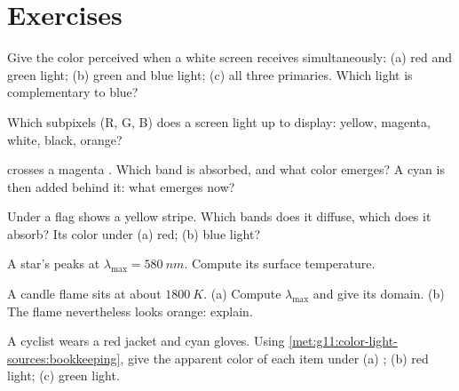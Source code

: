 \section{Exercises}

\begin{exercise}[$\star$]\label{exo:g11:color-light-sources:1}
Give the color perceived when a white screen receives simultaneously:
(a) red and green light; (b) green and blue light; (c) all three
primaries. Which light is complementary to blue?
\end{exercise}

\begin{exercise}[$\star$]\label{exo:g11:color-light-sources:2}
Which subpixels (R, G, B) does a screen light up to display: yellow,
magenta, white, black, orange?
\end{exercise}

\begin{exercise}[$\star$]\label{exo:g11:color-light-sources:3}
 crosses a magenta . Which band is absorbed, and what
color emerges? A cyan  is then added behind it: what emerges now?
\end{exercise}

\begin{exercise}[$\star$]\label{exo:g11:color-light-sources:4}
Under  a flag shows a yellow stripe. Which bands does it
diffuse, which does it absorb? Its color under (a) red; (b) blue light?
\end{exercise}

\begin{exercise}[$\star$]\label{exo:g11:color-light-sources:5}
A star's  peaks at $\lambda_{\max} = \qty{580}{nm}$.
Compute its surface temperature.
\end{exercise}

\begin{exercise}[$\star\star$]\label{exo:g11:color-light-sources:6}
A candle flame sits at about $\qty{1800}{K}$. (a) Compute
$\lambda_{\max}$ and give its domain. (b) The flame nevertheless looks
orange: explain.
\end{exercise}

\begin{exercise}[$\star\star$]\label{exo:g11:color-light-sources:7}
A cyclist wears a red jacket and cyan gloves. Using
\cref{met:g11:color-light-sources:bookkeeping}, give the apparent color
of each item under (a) ; (b) red light; (c) green light.
\end{exercise}

